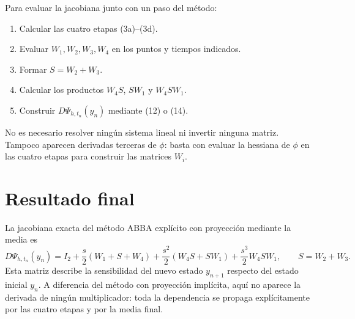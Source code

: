 \documentclass[11pt,a4paper]{article}
\newcommand{\Id}{I}
\begin{document}
Para evaluar la jacobiana junto con un paso del método:
\begin{enumerate}
 \item Calcular las cuatro etapas (3a)--(3d).
 \item Evaluar \(W_1,W_2,W_3,W_4\) en los puntos y tiempos indicados.
 \item Formar \(S=W_2+W_3\).
 \item Calcular los productos \(W_4S\), \(SW_1\) y \(W_4SW_1\).
 \item Construir \(D\Psi_{h,t_n}(y_n)\) mediante (12) o (14).
\end{enumerate}

No es necesario resolver ningún sistema lineal ni invertir ninguna matriz. Tampoco
aparecen derivadas terceras de \(\phi\): basta con evaluar la hessiana de \(\phi\) en
las cuatro etapas para construir las matrices \(W_i\).

\section{Resultado final}

La jacobiana exacta del método ABBA explícito con proyección mediante la media es
\[
 \boxed{
 D\Psi_{h,t_n}(y_n)
 =\Id_2
 +\frac{s}{2}(W_1+S+W_4)
 +\frac{s^2}{2}(W_4S+SW_1)
 +\frac{s^3}{2}W_4SW_1,
 \qquad
 S=W_2+W_3.}
\]
Esta matriz describe la sensibilidad del nuevo estado \(y_{n+1}\) respecto del estado
inicial \(y_n\). A diferencia del método con proyección implícita, aquí no aparece la
derivada de ningún multiplicador: toda la dependencia se propaga explícitamente por las
cuatro etapas y por la media final.
\end{document}
